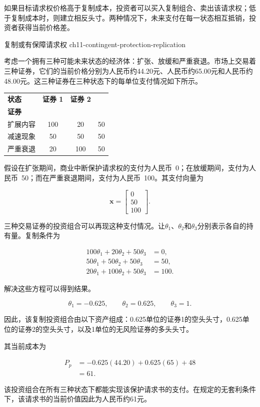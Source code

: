 如果目标请求权价格高于复制成本，投资者可以买入复制组合、卖出该请求权；低于复制成本时，则建立相反头寸。两种情况下，未来支付在每一状态相互抵销，投资者获得当前价格差。

\begin{example}{复制或有保障请求权}
{ch11-contingent-protection-replication}

考虑一个拥有三种可能未来状态的经济体：扩张、放缓和严重衰退。市场上交易着三种证券，它们的当前价格分别为人民币约44.20元、人民币约65.00元和人民币约48.00元。这三种证券在三种状态下的每单位支付情况如下所示。

\begin{center}
\begin{tabular}{@{}lccc@{}}
\toprule
\textbf{状态}
& \textbf{证券 1}
& \textbf{证券 2}
& \makecell{\textbf{无风险}\\\textbf{证券}} \\
\midrule
扩展内容       & 100 & 20  & 50 \\
减速现象        & 50  & 50  & 50 \\
严重衰退 & 20  & 100 & 50 \\
\bottomrule
\end{tabular}
\end{center}

假设在扩张期间，商业中断保护请求权的支付为人民币~0；在放缓期间，支付为人民币~50；而在严重衰退期间，支付为人民币~100。其支付向量为

\[
\mathbf{x}
=
\begin{bmatrix}
0\\
50\\
100
\end{bmatrix}.
\]

三种交易证券的投资组合可以再现这种支付情况。让$\theta_1$、$\theta_2$和$\theta_3$分别表示各自的持有量。复制条件为

\begin{align*}
100\theta_1+20\theta_2+50\theta_3&=0,\\
50\theta_1+50\theta_2+50\theta_3&=50,\\
20\theta_1+100\theta_2+50\theta_3&=100.
\end{align*}

解决这些方程可以得到结果。

\[
\theta_1=-0.625,\qquad
\theta_2=0.625,\qquad
\theta_3=1.
\]

因此，该复制投资组合由以下资产组成：0.625单位的证券1的空头头寸，0.625单位的证券2的空头头寸，以及1单位的无风险证券的多头头寸。

其当前成本为

\begin{align*}
P_p
&=-0.625(44.20)+0.625(65)+48\\
&=61.
\end{align*}

该投资组合在所有三种状态下都能实现该保护请求书的支付。在规定的无套利条件下，该请求书的当前价值因此为人民币约61元。

\end{example}


